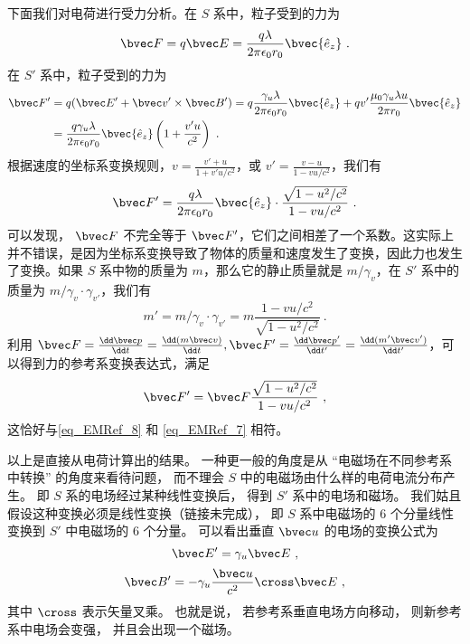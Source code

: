 下面我们对电荷进行受力分析。在 $S$ 系中，粒子受到的力为
\begin{equation}\label{eq_EMRef_8}
\bvec F=q\bvec E=\frac{q\lambda}{2\pi\epsilon_0 r_0} \bvec {\hat e_z}~.
\end{equation}
在 $S'$ 系中，粒子受到的力为
\begin{equation}
\begin{aligned}
\bvec F'&=q(\bvec E'+\bvec v'\times \bvec B')= q\frac{\gamma_u\lambda}{2\pi\epsilon_0 r_0} \bvec {\hat e_z}+qv'\frac{\mu_0\gamma_u \lambda u}{2\pi r_0} \bvec {\hat e_z}
\\
&=\frac{q\gamma_u\lambda}{2\pi\epsilon_0r_0}\bvec {\hat e_z}\left(1+\frac{v' u}{c^2}\right)~.
\end{aligned}
\end{equation}
根据速度的坐标系变换规则，$v=\frac{v'+u}{1+v'u/c^2}$，或 $v'=\frac{v-u}{1-vu/c^2}$，我们有
\begin{equation}\label{eq_EMRef_7}
\bvec F'=\frac{q\lambda}{2\pi\epsilon_0r_0}\bvec {\hat e_z} \cdot\frac{\sqrt{1-u^2/c^2}}{1-vu/c^2}~.
\end{equation}
可以发现， $\bvec F$ 不完全等于 $\bvec F'$，它们之间相差了一个系数。这实际上并不错误，是因为坐标系变换导致了物体的质量和速度发生了变换，因此力也发生了变换。如果 $S$ 系中物的质量为 $m$，那么它的静止质量就是 $m/\gamma_v$，在 $S'$ 系中的质量为 $m/\gamma_v \cdot \gamma_{v'}$，我们有
\begin{equation}
m'=m/\gamma_v\cdot \gamma_{v'}=m \frac{1-vu/c^2}{\sqrt{1-u^2/c^2}}~.
\end{equation}
利用 $\bvec F=\frac{\dd \bvec p}{\dd t}=\frac{\dd (m \bvec v)}{\dd t},\bvec F'=\frac{\dd \bvec p'}{\dd t'}=\frac{\dd (m'\bvec v')}{\dd t'}$，可以得到力的参考系变换表达式，满足
\begin{equation}
\bvec F'=\bvec F\frac{\sqrt{1-u^2/c^2}}{1-vu/c^2}~,
\end{equation}
这恰好与\autoref{eq_EMRef_8} 和 \autoref{eq_EMRef_7} 相符。


以上是直接从电荷计算出的结果。 一种更一般的角度是从 “电磁场在不同参考系中转换” 的角度来看待问题， 而不理会 $S$ 中的电磁场由什么样的电荷电流分布产生。 即 $S$ 系的电场经过某种线性变换后， 得到 $S'$ 系中的电场和磁场。 我们姑且假设这种变换必须是线性变换（链接未完成）， 即 $S$ 系中电磁场的 6 个分量线性变换到 $S'$ 中电磁场的 6 个分量。 可以看出垂直 $\bvec u$ 的电场的变换公式为
\begin{equation}\label{eq_EMRef_5}
\bvec E' = \gamma_u \bvec E~,
\end{equation}
\begin{equation}\label{eq_EMRef_6}
\bvec B' = -\gamma_u \frac{\bvec u}{c^2} \cross \bvec E~,
\end{equation}
其中 $\cross$ 表示矢量叉乘。 也就是说， 若参考系垂直电场方向移动， 则新参考系中电场会变强， 并且会出现一个磁场。

